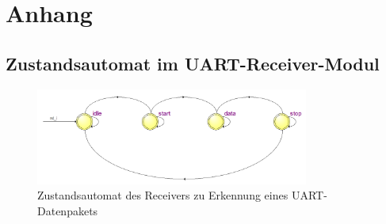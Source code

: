 \chapter{Anhang}

\section{Zustandsautomat im UART-Receiver-Modul} \label{sec:anhang1}

\begin{figure}[thb]
	\centering
  	\includegraphics[width=0.8\textwidth]{bilder/uart-receiver-data}
	\caption{Zustandsautomat des Receivers zu Erkennung eines UART-Datenpakets}
	\label{fig:uart-receiver-data}
\end{figure}

\newpage
